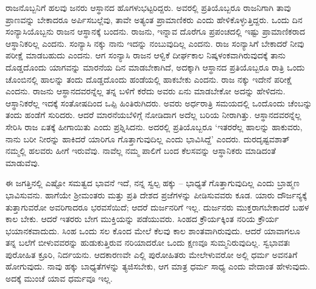 ರಾಜನೊಬ್ಬನಿಗೆ ಹಲವು ಜನರು ಆಸ್ಥಾನದ ಹೊಗಳುಭಟ್ಟರಿದ್ದರು. ಅವರಲ್ಲಿ ಪ್ರತಿಯೊಬ್ಬರೂ ರಾಜನಿಗಾಗಿ ತಾವು ಪ್ರಾಣವನ್ನು ಬೇಕಾದರೂ ಅರ್ಪಿಸಬಲ್ಲೆವು, ತಾವೇ ಅತ್ಯಂತ ಪ್ರಾಮಾಣಿಕರು ಎಂದು ಹೇಳಿಕೊಳ್ಳುತ್ತಿದ್ದರು. ಒಂದು ದಿನ ಸಂನ್ಯಾಸಿಯೊಬ್ಬನು ರಾಜನ ಆಸ್ಥಾನಕ್ಕೆ ಬಂದನು. ರಾಜನು, ಇನ್ನಾವ ದೊರೆಗೂ ಪ್ರಪಂಚದಲ್ಲಿ ಇಷ್ಟು ಪ್ರಾಮಾಣಿಕರಾದ ಆಸ್ಥಾನಿಕರಿಲ್ಲ ಎಂದನು. ಸಂನ್ಯಾಸಿ ನಕ್ಕು ನಾನು ಇದನ್ನು ನಂಬುವುದಿಲ್ಲ ಎಂದನು. ರಾಜ ಸಂನ್ಯಾಸಿಗೆ ಬೇಕಾದರೆ ನೀವು ಪರೀಕ್ಷೆ ಮಾಡಬಹುದು ಎಂದನು. ಆಗ ಸಂನ್ಯಾಸಿ ರಾಜನ ಆಳ್ವಿಕೆ ದೀರ್ಘಕಾಲ ನಿಷ್ಕಳಂಕವಾಗಿರುವುದಕ್ಕೆ ತಾನು ದೊಡ್ಡದೊಂದು ಯಾಗವನ್ನು ಮಾರನೆಯ ದಿನ ಮಾಡಬೇಕಾಗಿದೆ, ಅದಕ್ಕಾಗಿ ಆಸ್ಥಾನದ ಪ್ರತಿಯೊಬ್ಬರೂ ರಾತ್ರಿ ಒಂದು ಚೊಂಬಿನಲ್ಲಿ ಹಾಲನ್ನು ತಂದು ದೊಡ್ಡದೊಂದು ಹಂಡೆಯಲ್ಲಿ ಹಾಕಬೇಕು ಎಂದನು. ರಾಜ ನಕ್ಕು ಇದೇನೆ ಪರೀಕ್ಷೆ ಎಂದನು. ರಾಜನು ಆಸ್ಥಾನದವರನ್ನೆಲ್ಲ ತನ್ನ ಬಳಿಗೆ ಕರೆದು ಅವರು ಏನು ಮಾಡಬೇಕೋ ಅದನ್ನು ಹೇಳಿದನು. ಆಸ್ಥಾನಿಕರೆಲ್ಲ ಇದಕ್ಕೆ ಸಂತೋಷದಿಂದ ಒಪ್ಪಿ ಹಿಂತಿರುಗಿದರು. ಅವರು ಅರ್ಧರಾತ್ರಿ ಸಮಯದಲ್ಲಿ ಒಂದೊಂದು ಚೆಂಬನ್ನು ತಂದು ಹಂಡೆಗೆ ಸುರಿದರು. ಆದರೆ ಮಾರನೆಯಬೆಳಿಗ್ಗೆ ನೋಡಿದಾಗ ಅದೆಲ್ಲ ಬರಿಯ ನೀರಾಗಿತ್ತು. ಆಸ್ಥಾನದವರನ್ನೆಲ್ಲ ಸೇರಿಸಿ ರಾಜ ಏತಕ್ಕೆ ಹೀಗಾಯಿತು ಎಂದು ಪ್ರಶ್ನಿಸಿದನು. ಅದರಲ್ಲಿ ಪ್ರತಿಯೊಬ್ಬರೂ `ಇತರರೆಲ್ಲ ಹಾಲನ್ನು ಹಾಕುವರು, ನಾನು ಬರೀ ನೀರನ್ನು ಹಾಕಿದರೆ ಯಾರಿಗೂ ಗೊತ್ತಾಗುವುದಿಲ್ಲ ಎಂದು ಭಾವಿಸಿದ್ದೆ' ಎಂದರು. ದುರದೃಷ್ಟವಶಾತ್ ನಮ್ಮಲ್ಲಿ ಹಲವರು ಹೀಗೆ ಇರುವೆವು. ನಾವೆಲ್ಲ ನಮ್ಮ ಪಾಲಿಗೆ ಬಂದ ಕೆಲಸವನ್ನು ಆಸ್ಥಾನಿಕರು ಮಾಡಿದಂತೆ ಮಾಡುವೆವು.

ಈ ಜಗತ್ತಿನಲ್ಲಿ ಎಷ್ಟೋ ಸಮತ್ವದ ಭಾವನೆ ಇದೆ, ನನ್ನ ಸ್ವಲ್ಪ ಹಕ್ಕು – ಭಾಧ್ಯತೆ ಗೊತ್ತಾಗುವುದಿಲ್ಲ ಎಂದು ಬ್ರಾಹ್ಮಣ ಭಾವಿಸುವನು. ಹಾಗೆಯೇ ಶ‍್ರೀಮಂತರು ಮತ್ತು ಪ್ರತಿ ದೇಶದ ಪ್ರಜೆಗಳನ್ನು ಪೀಡಿಸುವವರು ಕೂಡ. ಯಾರು ದೌರ್ಜನ್ಯಕ್ಕೆ ತುತ್ತಾಗುವರೋ ಅವರಿಗಾದರೂ ಭರವಸೆಯಿದೆ; ಆದರೆ ದುರ್ಜನರಿಗೆ ಇಲ್ಲ. ದುರ್ಜನರು ಮುಕ್ತರಾಗಬೇಕಾದರೆ ಬಹಳ ಕಾಲ ಬೇಕು. ಆದರೆ ಇತರರು ಬೇಗ ಮುಕ್ತಿಯನ್ನು ಪಡೆಯುವರು. ಸಿಂಹದ ಕ್ರೌರ್ಯಕ್ಕಿಂತ ನರಿಯ ಕ್ರೌರ್ಯ ಭಯಾನಕವಾದುದು. ಸಿಂಹ ಒಂದು ಸಲ ಕೊಂದ ಮೇಲೆ ಕೆಲವು ಕಾಲ ಶಾಂತವಾಗಿರುವುದು. ಆದರೆ ಯಾವಾಗಲೂ ತನ್ನ ಬಲೆಗೆ ಬೀಳುವವರನ್ನು ಹುಡುಕುತ್ತಿರುವ ನರಿಯಾದರೋ ಒಂದು ಕ್ಷಣವೂ ಸುಮ್ಮನಿರುವುದಿಲ್ಲ. ಸ್ವಭಾವತಃ ಪುರೋಹಿತ ಕ್ರೂರಿ, ನಿರ್ದಯನು. ಆದಕಾರಣವೇ ಎಲ್ಲಿ ಪುರೋಹಿತರು ಮೇಲೇಳುವರೋ ಅಲ್ಲಿ ಧರ್ಮ ಅವನತಿಗೆ ಹೋಗುವುದು. ನಾವು ಹಕ್ಕು ಬಾಧ್ಯತೆಗಳನ್ನು ತ್ಯಜಿಸಬೇಕು, ಆಗ ಮಾತ್ರ ಧರ್ಮ ಸಾಧ್ಯ ಎಂದು ವೇದಾಂತ ಹೇಳುವುದು. ಅದಕ್ಕೆ ಮುಂಚೆ ಯಾವ ಧರ್ಮವೂ ಇಲ್ಲ.

